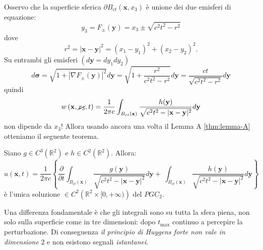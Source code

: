 \documentclass[10pt,a4paper,twoside,openright]{book}
\newcommand{\x}{\mathbf{x}}
\newcommand{\y}{\mathbf{y}}
\begin{document}
Osservo che la superficie sferica $\displaystyle \partial B_{ct}(\x ,x_{3})$ è unione dei due emisferi di equazione:
\begin{equation*}
	y_{3} =F_{\pm }(\y) =x_{3} \pm \sqrt{c^{2} t^{2} -r^{2}}
\end{equation*}
dove
\begin{equation*}
	r^{2} =| \x -\y| ^{2} =( x_{1} -y_{1})^{2} +( x_{2} -y_{2})^{2} .
\end{equation*}
Su entrambi gli emisferi $\displaystyle ( d\y =dy_{1} dy_{2})$
\begin{equation*}
	d\bm{\sigma } =\sqrt{1+| \nabla F_{\pm }(\y)| ^{2}} d\y =\sqrt{1+\frac{r^{2}}{c^{2} t^{2} -r^{2}}} d\y =\frac{ct}{\sqrt{c^{2} t^{2} -r^{2}}} d\y
\end{equation*}
quindi
\begin{equation*}
	w\left(\x ,\cancel{x_{3}} ,t\right) =\frac{1}{2\pi c}\int _{B_{ct}(\x)}\frac{h(\y)}{\sqrt{c^{2} t^{2} -| \x -\y| ^{2}}} d\y
\end{equation*}
non dipende da $\displaystyle x_{3}$! Allora usando ancora una volta il Lemma A \ref{thm:lemma-A} otteniamo il seguente teorema.
\begin{theorem}
	 Siano $\displaystyle g\in C^{3}\left(\mathbb{R}^{2}\right)$ e $\displaystyle h\in C^{2}\left(\mathbb{R}^{2}\right)$. Allora:
	\begin{equation}
		u(\x ,t) =\frac{1}{2\pi c}\left\{\frac{\partial }{\partial t}\int _{B_{ct}(\x)}\frac{g(\y)}{\sqrt{c^{2} t^{2} -| \x -\y| ^{2}}} d\y +\ \int _{B_{ct}(\x)}\frac{h(\y)}{\sqrt{c^{2} t^{2} -| \x -\y| ^{2}}} d\y\right\}
	\end{equation}
	è l'unica soluzione $\displaystyle \in C^{2}\left(\mathbb{R}^{2} \times [ 0,+\infty )\right)$ del $\displaystyle PGC_{2}$.
\end{theorem}
Una differenza fondamentale è che gli integrali sono su tutta la sfera piena, non solo sulla superficie come in tre dimensioni: dopo $\displaystyle t_{\max}$ continuo a percepire la perturbazione. Di conseguenza \textit{il principio di Huygens forte non vale in dimensione }$\displaystyle 2$ e non esistono segnali \textit{istantanei}.
\end{document}
